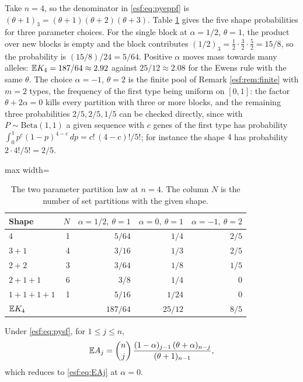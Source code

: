 \begin{example}
\label{esf:ex:py4}
Take $n = 4$, so the denominator in \eqref{esf:eq:pyeppf} is
$(\theta+1)_3 = (\theta+1)(\theta+2)(\theta+3)$. Table \ref{esf:tab:py4} gives the five
shape probabilities for three parameter choices. For the single block at
$\alpha = 1/2$, $\theta = 1$, the product over new blocks is empty and the block
contributes $(1/2)_3 = \tfrac12 \cdot \tfrac32 \cdot \tfrac52 = 15/8$, so the
probability is $(15/8)/24 = 5/64$. Positive $\alpha$ moves mass towards many alleles:
$\mathbb{E} K_4 = 187/64 \approx 2.92$ against $25/12 \approx 2.08$ for the Ewens rule with the
same $\theta$. The choice $\alpha = -1$, $\theta = 2$ is the finite pool of Remark
\ref{esf:rem:finite} with $m = 2$ types, the frequency of the first type being uniform
on $[0,1]$: the factor
$\theta + 2\alpha = 0$ kills every partition with three or more blocks, and the
remaining three probabilities $2/5, 2/5, 1/5$ can be checked directly, since with
$P \sim \mathrm{Beta}(1,1)$ a given sequence with $c$ genes of the first type has
probability $\int_0^1 p^{c}(1-p)^{4-c}\,dp = c!\,(4-c)!/5!$; for instance the shape $4$
has probability $2 \cdot 4!/5! = 2/5$.
\end{example}

\begin{table}[htbp]
\centering
\caption{The two parameter partition law at $n = 4$. The column $N$ is the number of
set partitions with the given shape.}
\label{esf:tab:py4}
\begin{adjustbox}{max width=\textwidth}
\begin{tabular}{lrrrr}
\toprule
Shape & $N$ & $\alpha = 1/2,\ \theta = 1$ & $\alpha = 0,\ \theta = 1$ & $\alpha = -1,\ \theta = 2$ \\
\midrule
$4$       & 1 & $5/64$  & $1/4$  & $2/5$ \\
$3+1$     & 4 & $3/16$  & $1/3$  & $2/5$ \\
$2+2$     & 3 & $3/64$  & $1/8$  & $1/5$ \\
$2+1+1$   & 6 & $3/8$   & $1/4$  & $0$ \\
$1+1+1+1$ & 1 & $5/16$  & $1/24$ & $0$ \\
\midrule
$\mathbb{E} K_4$  &   & $187/64$ & $25/12$ & $8/5$ \\
\bottomrule
\end{tabular}
\end{adjustbox}
\end{table}

\begin{proposition}
\label{esf:prop:pyEA}
Under \eqref{esf:eq:pysf}, for $1 \le j \le n$,
\begin{equation}
\mathbb{E} A_j = \binom{n}{j} \,
\frac{(1-\alpha)_{j-1} \, (\theta + \alpha)_{n-j}}
{(\theta+1)_{n-1}} ,
\label{esf:eq:pyEA}
\end{equation}
which reduces to \eqref{esf:eq:EAj} at $\alpha = 0$.
\end{proposition}

